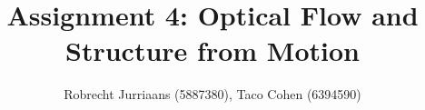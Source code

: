 \documentclass[a4paper,10pt]{article}
\title{Assignment 4: Optical Flow and Structure from Motion}
\author{Robrecht Jurriaans (5887380), Taco Cohen (6394590)}
\begin{document}
\maketitle

\begin{abstract}

\end{abstract}

\section{}
\end{document}

